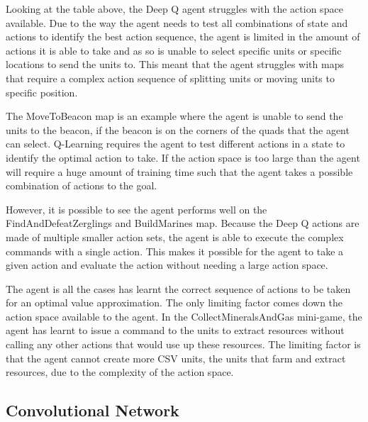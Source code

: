 Looking at the table above, the Deep Q agent struggles with the action space
available. Due to the way the agent needs to test all combinations of state and
actions to identify the best action sequence, the agent is limited in the amount
of actions it is able to take and as so is unable to select specific units or
specific locations to send the units to. This meant that the agent struggles
with maps that require a complex action sequence of splitting units or moving
units to specific position.

The MoveToBeacon map is an example where the agent is unable to send the units
to the beacon, if the beacon is on the corners of the quads that the agent can
select. Q-Learning requires the agent to test different actions in a state to
identify the optimal action to take. If the action space is too large than the
agent will require a huge amount of training time such that the agent takes a
possible combination of actions to the goal.

However, it is possible to see the agent performs well on the
FindAndDefeatZerglings and BuildMarines map. Because the Deep Q actions are made
of multiple smaller action sets, the agent is able to execute the complex
commands with a single action. This makes it possible for the agent to take a
given action and evaluate the action without needing a large action space.

The agent is all the cases has learnt the correct sequence of actions to be taken for an optimal value approximation. The only limiting factor comes down the action space available to the agent. In the CollectMineralsAndGas mini-game, the agent has learnt to issue a command to the units to extract resources without calling any other actions that would use up these resources. The limiting factor is that the agent cannot create more CSV units, the units that farm and extract resources, due to the complexity of the action space.

\subsection{Convolutional Network}

